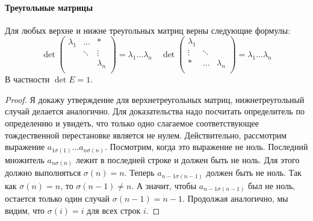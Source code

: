 \paragraph{Треугольные матрицы}

\begin{claim}
\label{claim::DetUpperTr}
Для любых верхне и нижне треугольных матриц верны следующие формулы:
\[
\det
\begin{pmatrix}
{\lambda_1}&{\ldots}&{*}\\
{}&{\ddots}&{\vdots}\\
{}&{}&{\lambda_n}\\
\end{pmatrix}
 = 
\lambda_1 \ldots \lambda_n
\quad
\det
\begin{pmatrix}
{\lambda_1}&{}&{}\\
{\vdots}&{\ddots}&{}\\
{*}&{\ldots}&{\lambda_n}\\
\end{pmatrix}
 = 
 \lambda_1 \ldots \lambda_n
\]
В частности $\det E = 1$.
\end{claim}
\begin{proof}
Я докажу утверждение для верхнетреугольных матриц, нижнетреугольный случай делается аналогично.
Для доказательства надо посчитать определитель по определению и увидеть, что только одно слагаемое соответствующее тождественной перестановке является не нулем.
Действительно, рассмотрим выражение $a_{1\sigma(1)}\ldots a_{n\sigma(n)}$.
Посмотрим, когда это выражение не ноль.
Последний множитель $a_{n\sigma(n)}$ лежит в последней строке и должен быть не ноль.
Для этого должно выполняться $\sigma(n) = n$.
Теперь $a_{n-1\sigma(n-1)}$ должен быть не ноль.
Так как $\sigma(n) = n$, то $\sigma(n - 1)\neq n$.
А значит, чтобы $a_{n-1 \sigma(n-1)}$ был не ноль, остается только один случай $\sigma(n-1) = n-1$.
Продолжая аналогично, мы видим, что $\sigma(i) = i$ для всех строк $i$.
\end{proof}
